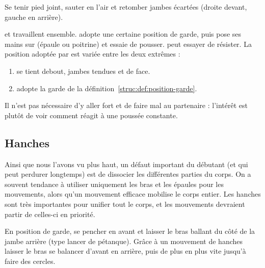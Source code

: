 \begin{exercice}

Se tenir pied joint, sauter en l'air et retomber jambes écartées (droite devant, gauche en arrière).


\end{exercice}


\begin{exercice}
\label{struc:ex:test-position}


\A et \D travaillent ensemble.
\D adopte une certaine position de garde, puis \A pose ses mains sur \D (épaule ou poitrine) et essaie de pousser.
\D peut essayer de résister.
La position adoptée par \D est variée entre les deux extrêmes :
\begin{enumerate}
	\item \D se tient debout, jambes tendues et de face.
	\item \D adopte la garde de la définition~\ref{struc:def:position-garde}.
\end{enumerate}

Il n'est pas nécessaire d'y aller fort et de faire mal au partenaire : l'intérêt est plutôt de voir comment \D réagit à une poussée constante.

\end{exercice}


\subsection{Hanches}


Ainsi que nous l'avons vu plus haut, un défaut important du débutant (et qui peut perdurer longtemps) est de dissocier les différentes parties du corps.
On a souvent tendance à utiliser uniquement les bras et les épaules pour les mouvements, alors qu'un mouvement efficace mobilise le corps entier.
Les hanches sont très importantes pour unifier tout le corps, et les mouvements devraient partir de celles-ci en priorité.


\begin{exercice}
En position de garde, se pencher en avant et laisser le bras ballant du côté de la jambe arrière (type lancer de pétanque).
Grâce à un mouvement de hanches laisser le bras se balancer d'avant en arrière, puis de plus en plus vite jusqu'à faire des cercles.

\end{exercice}


